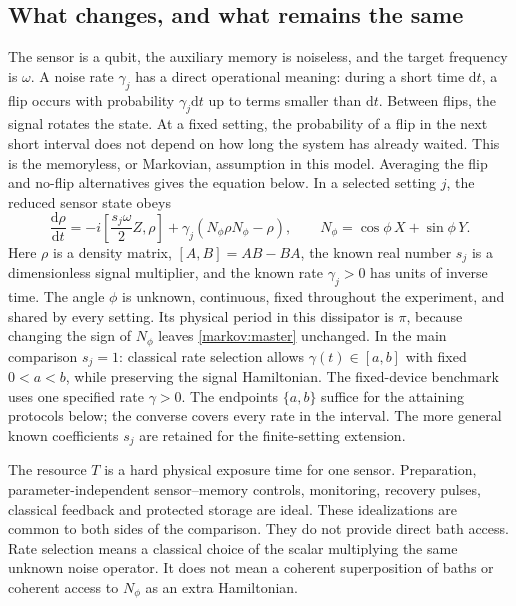 \documentclass[11pt,a4paper]{article}
\numberwithin{equation}{section}
\theoremstyle{remark}
\begin{document}
\subsection{What changes, and what remains the same}

The sensor is a qubit, the auxiliary memory is noiseless, and the target
frequency is $\omega$. A noise rate $\gamma_j$ has a direct operational
meaning: during a short time $\mathrm dt$, a flip occurs with probability
$\gamma_j\mathrm dt$ up to terms smaller than $\mathrm dt$. Between flips,
the signal rotates the state. At a fixed setting, the probability of a flip
in the next short interval does not depend on how long the system has already
waited. This is the memoryless, or Markovian, assumption in this model.
Averaging the flip and no-flip alternatives gives the equation below.
In a selected setting $j$, the reduced sensor state obeys
\begin{equation}
 \frac{\mathrm d\rho}{\mathrm dt}
 =-i\left[\frac{s_j\omega}{2}Z,\rho\right]
   +\gamma_j(N_\phi\rho N_\phi-\rho),
 \qquad N_\phi=\cos\phi\,X+\sin\phi\,Y.
 \label{markov:master}
\end{equation}
Here $\rho$ is a density matrix, $[A,B]=AB-BA$, the known real number $s_j$
is a dimensionless signal multiplier, and the known rate $\gamma_j>0$ has units
of inverse time. The angle $\phi$ is unknown, continuous, fixed throughout the
experiment, and shared by every setting. Its physical period in this
dissipator is $\pi$, because changing the sign of $N_\phi$ leaves
\eqref{markov:master} unchanged. In the main comparison $s_j=1$: classical rate selection allows
$\gamma(t)\in[a,b]$ with fixed $0<a<b$, while preserving the signal
Hamiltonian. The fixed-device benchmark uses one specified rate $\gamma>0$.
The endpoints $\{a,b\}$ suffice for the attaining protocols below; the
converse covers every rate in the interval. The more general known
coefficients $s_j$ are retained for the finite-setting extension.

The resource $T$ is a hard physical exposure time for one sensor. Preparation,
parameter-independent sensor--memory controls, monitoring, recovery pulses,
classical feedback and protected storage are ideal. These idealizations are
common to both sides of the comparison. They do not provide direct bath access.
Rate selection means a classical choice of the scalar multiplying the same
unknown noise operator. It does not mean a coherent superposition of baths or
coherent access to $N_\phi$ as an extra Hamiltonian.
\end{document}
